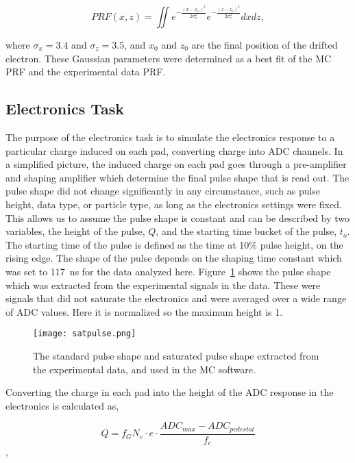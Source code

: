 \begin{equation}
PRF(x,z) = \iint e^{-\frac{(x-x_o)^2}{2\sigma_x^2}} e^{-\frac{(z-z_o)^2}{2\sigma_z^2}}dxdz,
\end{equation}

where $\sigma_x = 3.4$ and $\sigma_z = 3.5$, and $x_0$ and $z_0$ are the final position of the drifted electron. These Gaussian parameters were determined as a best fit of the MC PRF and the experimental data PRF. 


\subsection{Electronics Task}

The purpose of the electronics task is to simulate the electronics response to a particular charge induced on each pad, converting charge into ADC channels. In a simplified picture, the induced charge on each pad goes through a pre-amplifier and shaping amplifier which determine the final pulse shape that is read out. The pulse shape did not change significantly in any circumstance, such as pulse height, data type, or particle type, as long as the electronics settings were fixed. This allows us to assume the pulse shape is constant and can be described by two variables, the height of the pulse, $Q$, and the starting time bucket of the pulse, $t_o$. The starting time of the pulse is defined as the time at 10\% pulse height, on the rising edge. The shape of the pulse depends on the shaping time constant which was set to \SI{117}{\nano\second} for the data analyzed here. Figure~\ref{fig:pulseshape} shows the pulse shape which was extracted from the experimental signals in the data. These were signals that did not saturate the electronics and were averaged over a wide range of ADC values. Here it is normalized so the maximum height is 1. 



\begin{figure}[!htb]
    \centering       
    \texttt{[image: satpulse.png]} 
    \caption{The standard pulse shape and saturated pulse shape extracted from the experimental data, and used in the MC software.}
    \label{fig:pulseshape}
\end{figure}


Converting the charge in each pad into the height of the ADC response in the electronics is calculated as, 

\begin{equation}
Q = f_G  N_{e}  \cdot e \cdot\frac{ADC_{max} - ADC_{pedestal}}{f_c}
\label{eq:etoADC}
\end{equation},

